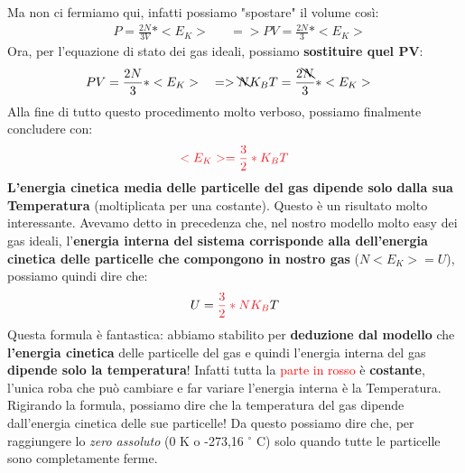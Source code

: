                    Ma non ci fermiamo qui, infatti possiamo "spostare" il volume così:
                    \begin{align*}
                        &P=\frac{2N}{3V}*<E_K>&&=>PV=\frac{2N}{3}*<E_K>
                    \end{align*}
                    Ora, per l'equazione di stato dei gas ideali, possiamo \textbf{sostituire quel $\mathbf{PV}$}:
                    \begin{align*}
                        & PV=\frac{2N}{3}*<E_K> && => \bcancel{N}K_BT=\frac{2\bcancel{N}}{3}*<E_K>
                    \end{align*}
                    Alla fine di tutto questo procedimento molto verboso, possiamo finalmente concludere con:
                    \begin{align*}
                        \textcolor{Red}{<E_K>=\frac{3}{2}*K_BT}
                    \end{align*}
                    \textbf{L'energia cinetica media delle particelle del gas dipende solo dalla sua Temperatura} (moltiplicata per una costante). Questo è un risultato molto interessante. Avevamo detto in precedenza che, nel nostro modello molto easy dei gas ideali, l'\textbf{energia interna del sistema corrisponde alla dell'energia cinetica delle particelle che compongono in nostro gas} ($N<E_K>=U$), possiamo  quindi dire che:
                    \begin{align*}
                        U=\textcolor{Red}{\frac{3}{2}*NK_B}T
                    \end{align*}
                    Questa formula è fantastica: abbiamo stabilito per \textbf{deduzione dal modello} che \textbf{l'energia cinetica} delle particelle del gas e quindi l'energia interna del gas \textbf{dipende solo la temperatura}! Infatti tutta la \textcolor{Red}{parte in rosso} è \textbf{costante}, l'unica roba che può cambiare e far variare l'energia interna è la Temperatura. Rigirando la formula, possiamo dire che la temperatura del gas dipende dall'energia cinetica delle sue particelle! Da questo possiamo dire che, per raggiungere lo \textit{zero assoluto} (0 K o -273,16 $^\circ$ C) solo quando tutte le particelle sono completamente ferme.

